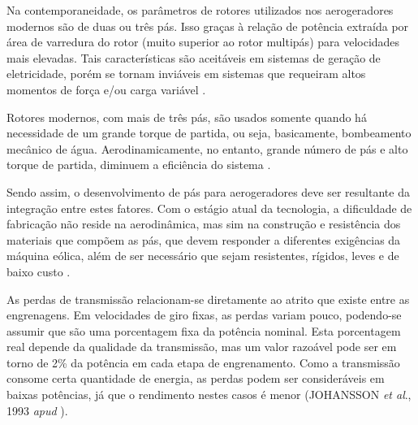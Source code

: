     Na contemporaneidade, os parâmetros de rotores utilizados nos aerogeradores modernos são de duas ou três pás.
    Isso graças à relação de potência extraída por área de varredura do rotor (muito superior ao rotor multipás) para 
    velocidades mais elevadas. Tais características são aceitáveis em sistemas de geração de eletricidade, porém se tornam
    inviáveis em sistemas que requeiram altos momentos de força e/ou carga variável \cite{terciote02}.
    
    Rotores modernos, com mais de três pás, são usados somente quando há necessidade de um grande torque de partida, ou seja, 
    basicamente, bombeamento mecânico de água. Aerodinamicamente, no entanto, grande número de pás e alto torque de partida,
    diminuem a eficiência do sistema \cite{terciote02}.

    Sendo assim, o desenvolvimento de pás para aerogeradores deve ser resultante da integração entre estes fatores.
    Com o estágio atual da tecnologia, a dificuldade de fabricação não reside na aerodinâmica, mas sim na construção
    e resistência dos materiais que compõem as pás, que devem responder a diferentes exigências da máquina eólica,
    além de ser necessário que sejam resistentes, rígidos, leves e de baixo custo \cite{terciote02}.
    
    As perdas de transmissão relacionam-se diretamente ao atrito que existe entre as engrenagens.
    Em velocidades de giro fixas, as perdas variam pouco, podendo-se assumir que são uma porcentagem fixa
    da potência nominal. Esta porcentagem real depende da qualidade da transmissão, mas um valor razoável
    pode ser em torno de 2\% da potência em cada etapa de engrenamento. Como a transmissão consome certa quantidade de
    energia, as perdas podem ser consideráveis em baixas potências, já que o rendimento nestes casos é menor
    (JOHANSSON \textit{et al}., 1993 \textit{apud} \cite{terciote02}).
    
